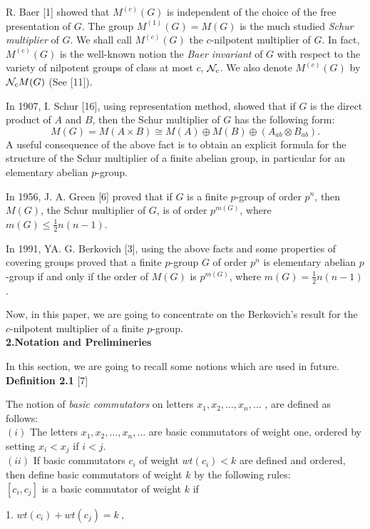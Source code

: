  R. Baer [1] showed that $M^{(c)}(G)$ is independent of the choice of the free
presentation of $G$. The group $M^{(1)}(G)=M(G)$ is the much studied {\it Schur
multiplier} of $G$. We shall call $M^{(c)}(G)$ the $c$-nilpotent multiplier of
$G$. In fact, $M^{(c)}(G)$ is the well-known notion the {\it Baer invariant} of
$G$ with respect to the variety of nilpotent groups of class at most $c$, ${\cal
N}_c$. We also denote $M^{(c)}(G)$ by ${\cal N}_cM(G)$ (See [11]).

 In 1907, I. Schur [16], using representation method, showed that if $G$ is the
direct product of $A$ and $B$, then the Schur multiplier of
$G$ has the following form:
   $$ M(G)=M(A\times B)\cong M(A)\oplus M(B)\oplus (A_{ab}\otimes B_{ab}).$$
 A useful consequence of the above fact is to obtain an explicit formula for the
structure of the Schur multiplier of a finite abelian group, in particular for
an elementary abelian $p$-group.

 In 1956, J. A. Green [6] proved that if $G$ is a finite $p$-group of order
$p^n$, then $M(G)$, the Schur multiplier of $G$, is of order $p^{m(G)}$, where
$m(G)\leq\frac{1}{2}n(n-1)$.

 In 1991, YA. G. Berkovich [3], using the above facts and some properties of
covering groups proved that a finite $p$-group $G$ of order $p^n$
is elementary abelian $p$-group if and only if the order of
$M(G)$ is $p^{m(G)}$, where $m(G)=\frac{1}{2}n(n-1)$.

 Now, in this paper, we are going to concentrate on the Berkovich's
result for the $c$-nilpotent multiplier of a finite $p$-group.\\
 {\bf 2.Notation and Prelimineries}

 In this section, we are going to recall some notions which are used in
future.\\
{\bf Definition 2.1} [7]

 The notion of {\it basic commutators} on letters $x_1,x_2,\ldots , x_n,\ldots$
, are defined as follows:\\
$(i)$ The letters $x_1,x_2,\ldots ,x_n,\ldots $ are basic commutators of weight
one, ordered by setting $x_i<x_j$ if $i<j$.\\
$(ii)$ If basic commutators $c_i$ of weight $wt(c_i)<k$ are defined and
ordered, then define basic commutators of weight $k$ by the following rules:\\
$[c_i,c_j]$ is a basic commutator of weight $k$ if

 1. $wt(c_i)+wt(c_j)=k\ ,$

